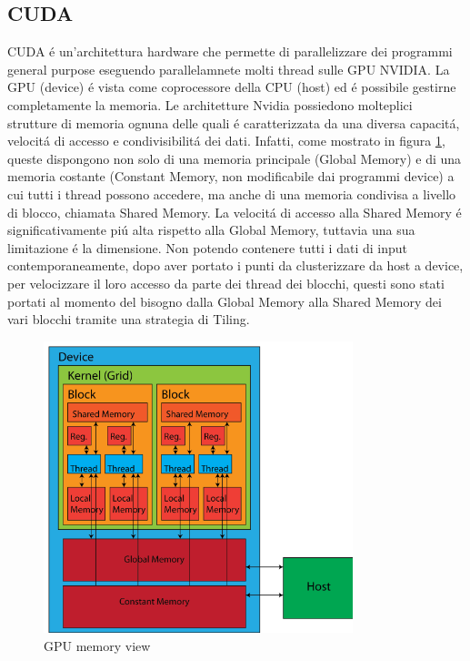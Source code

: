 \documentclass{article}
\begin{document}
\newpage

\subsection{CUDA}

CUDA \'e un'architettura hardware che permette di parallelizzare dei programmi general purpose eseguendo parallelamnete molti thread sulle GPU NVIDIA. La GPU (device) \'e vista come coprocessore della CPU (host) ed \'e possibile gestirne completamente la memoria. Le architetture Nvidia possiedono molteplici strutture di memoria ognuna delle quali \'e caratterizzata da una diversa capacit\'a, velocit\'a di accesso e condivisibilit\'a dei dati. Infatti, come mostrato in figura \ref{Memory}, queste dispongono non solo di una memoria principale (Global Memory) e di una memoria costante (Constant Memory, non modificabile dai programmi device) a cui tutti i thread possono accedere, ma anche di una memoria condivisa a livello di blocco, chiamata Shared Memory. La velocit\'a di accesso alla Shared Memory \'e significativamente pi\'u alta rispetto alla Global Memory, tuttavia una sua limitazione \'e la dimensione. Non potendo contenere tutti i dati di input contemporaneamente, dopo aver portato i punti da clusterizzare da host a device, per velocizzare il loro accesso da parte dei thread dei blocchi, questi sono stati portati al momento del bisogno dalla Global Memory alla Shared Memory dei vari blocchi tramite una strategia di Tiling.

\vspace{30px}

\begin{figure}[!h]
\centering
\includegraphics[width= 9cm]{"Immagini/Memory.PNG"}
\caption{GPU memory view}
\label{Memory}
\end{figure} 
\end{document}
